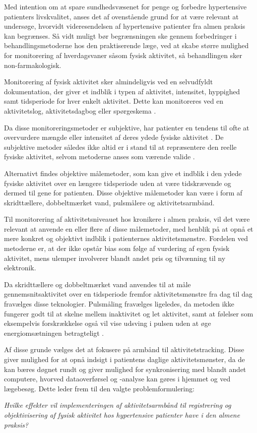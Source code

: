Med intention om at spare sundhedsvæsenet for penge og forbedre hypertensive patienters livskvalitet, anses det af ovenstående grund for at være relevant at undersøge, hvorvidt videresendelsen af hypertensive patienter fra almen praksis kan begrænses. Så vidt muligt bør begrænsningen ske gennem forbedringer i behandlingsmetoderne hos den praktiserende læge, ved at skabe større mulighed for monitorering af hverdagsvaner såsom fysisk aktivitet, så behandlingen sker non-farmakologisk.

Monitorering af fysisk aktivitet sker almindeligvis ved en selvudfyldt dokumentation, der giver et indblik i typen af aktivitet, intensitet, hyppighed samt tidsperiode for hver enkelt aktivitet. Dette kan monitoreres ved en aktivitetslog, aktivitetsdagbog eller spørgeskema \citep{adamo2009}. 

Da disse monitoreringsmetoder er subjektive, har patienter en tendens til ofte at overvurdere mængde eller intensitet af deres ydede fysiske aktivitet \citep{adamo2009}. De subjektive metoder således ikke altid er i stand til at repræsentere den reelle fysiske aktivitet, selvom metoderne anses som værende valide \citep{motionsraad2007, pedersen2011}. 

Alternativt findes objektive målemetoder, som kan give et indblik i den ydede fysiske aktivitet over en længere tidsperiode uden at være tidskrævende og dermed til gene for patienten. Disse objektive målemetoder kan være i form af skridttællere, dobbeltmærket vand, pulsmålere og aktivitetsarmbånd.


Til monitorering af aktivitetsniveauet hos kronikere i almen praksis, vil det være relevant at anvende en eller flere af disse målemetoder, med henblik på at opnå et mere konkret og objektivt indblik i patienternes aktivitetsmønstre. Fordelen ved metoderne er, at der ikke opstår bias som følge af vurdering af egen fysisk aktivitet, mens ulemper involverer blandt andet pris og tilvænning til ny elektronik. 

Da skridttællere og dobbeltmærket vand anvendes til at måle gennemsnitsaktivitet over en tidsperiode fremfor aktivitetsmønstre fra dag til dag fravælges disse teknologier. 
Pulsmåling fravælges ligeledes, da metoden ikke fungerer godt til at skelne mellem inaktivitet og let aktivitet, samt at følelser som eksempelvis forskrækkelse også vil vise udsving i pulsen uden at øge energiomsætningen betragteligt \citep{motionsraad2007}. 

Af disse grunde vælges det at fokusere på armbånd til aktivitetstracking. Disse giver  mulighed for at opnå indsigt i patientens daglige aktivitetsmønster, da de kan bæres døgnet rundt og giver mulighed for synkronisering med blandt andet computere, hvorved dataoverførsel og -analyse kan gøres i hjemmet og ved lægebesøg. Dette leder frem til den valgte problemformulering: 

\begin{center}
\textit{Hvilke effekter vil implementeringen af aktivitetsarmbånd til registrering og objektivisering af fysisk aktivitet hos hypertensive patienter have i den almene praksis?}
\end{center}